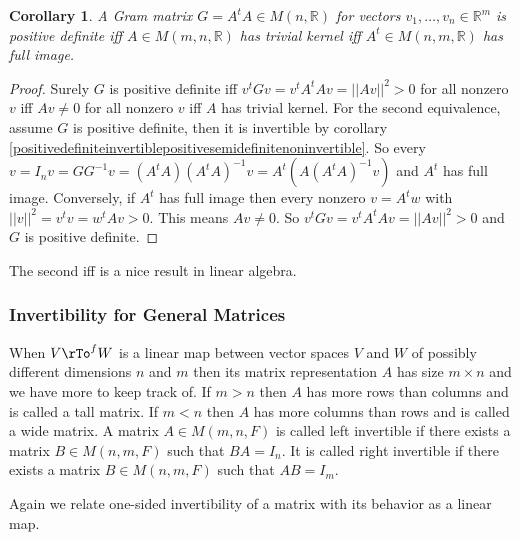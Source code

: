 \documentclass[12pt]{amsart}
\newtheorem{corollary}[theorem]{Corollary}
\theoremstyle{definition}
\begin{document}
\begin{corollary}\label{positivedefiniteAtrivialkernelA^tfullimage} A Gram matrix $G = A^tA \in M(n, \mathbb{R})$ for vectors $v_1, \dots, v_n \in \mathbb{R}^m$ is positive definite iff $A \in M(m, n, \mathbb{R})$ has trivial kernel iff $A^t \in M(n, m, \mathbb{R})$ has full image.
\end{corollary}
\begin{proof} Surely $G$ is positive definite iff $v^tGv = v^tA^tAv = ||Av||^2 > 0$ for all nonzero $v$ iff $Av \neq 0$ for all nonzero $v$ iff $A$ has trivial kernel. For the second equivalence, assume $G$ is positive definite, then it is invertible by corollary \ref{positivedefiniteinvertiblepositivesemidefinitenoninvertible}. So every $v = I_n v = GG^{-1}v = (A^tA)(A^tA)^{-1}v = A^t(A(A^tA)^{-1}v)$ and $A^t$ has full image. Conversely, if $A^t$ has full image then every nonzero $v = A^t w$ with $||v||^2 = v^tv = w^tAv > 0$. This means $Av \neq 0$. So $v^tGv = v^tA^tAv = ||Av||^2 > 0$ and $G$ is positive definite.
\end{proof}

The second iff is a nice result in linear algebra.

\subsubsection{Invertibility for General Matrices} When $V \rTo^f W$ is a linear map between vector spaces $V$ and $W$ of possibly different dimensions $n$ and $m$ then its matrix representation $A$ has size $m \times n$ and we have more to keep track of. If $m > n$ then $A$ has more rows than columns and is called a tall matrix. If $m < n$ then $A$ has more columns than rows and is called a wide matrix.
\dfn A matrix $A \in M(m, n, F)$ is called left invertible if there exists a matrix $B \in M(n, m, F)$ such that $BA = I_n$. It is called right invertible if there exists a matrix $B \in M(n, m, F)$ such that $AB = I_m$.

Again we relate one-sided invertibility of a matrix with its behavior as a linear map.
\end{document}
